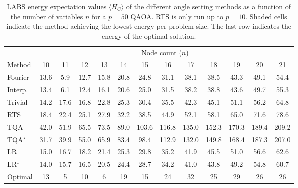 \documentclass[twocolumn,
english,
aps,
pra,
10pt,
longbibliography,
superscriptaddress,
amsmath,
amssymb,
floatfix
]{revtex4-2}
\begin{document}
{\begin{table}[t]
\centering
\caption{
LABS energy expectation values $\langle H_C \rangle$ of the different angle setting methods as a function of the number of variables $n$ for a $p=50$ QAOA. 
RTS is only run up to $p=10$.
Shaded cells indicate the method achieving the lowest energy per problem size.
The last row indicates the energy of the optimal solution.
}
\label{tab:labs_energy}
\footnotesize
\setlength{\tabcolsep}{3.3pt} 
\begin{tabular}{l *{12}{c}}
\hline\hline
& \multicolumn{12}{c}{Node count ($n$)} \\
Method & 10 & 11 & 12 & 13 & 14 & 15 & 16 & 17 & 18 & 19 & 20 & 21 \\ 
\midrule
Fourier     & 13.6 & \cellcolor[HTML]{C0C0C0}5.9 & 12.7 & \cellcolor[HTML]{C0C0C0}15.8 & 20.8 & \cellcolor[HTML]{C0C0C0}24.8 & \cellcolor[HTML]{C0C0C0}31.1 & \cellcolor[HTML]{C0C0C0}38.1 & \cellcolor[HTML]{C0C0C0}38.5 & \cellcolor[HTML]{C0C0C0}43.3 & \cellcolor[HTML]{C0C0C0}49.1 & \cellcolor[HTML]{C0C0C0}54.4 \\
Interp.      & \cellcolor[HTML]{C0C0C0}13.4 & 6.1 & \cellcolor[HTML]{C0C0C0}12.4 & 16.1 & \cellcolor[HTML]{C0C0C0}20.6 & 25.0 & 31.5 & 38.2 & 38.8 & 43.6 & 49.7 & 55.3 \\
Trivial     & 14.2 & 17.6 & 16.8 & 22.8 & 25.3 & 30.4 & 35.5 & 42.3 & 45.1    & 51.1 & 56.2 & 64.8 \\
RTS         & 18.4 & 22.4 & 25.1 & 27.9 & 32.2 & 38.5 & 44.9 & 52.1 & 58.1    & 65.0 & 71.6 & 78.6 \\
TQA         & 42.0 & 51.9 & 65.5 & 73.5 & 89.0 & 103.6 & 116.8 & 135.0 & 152.3 & 170.3 & 189.4 & 209.2 \\
TQA$^\star$ & 31.7 & 39.9 & 55.0 & 65.9 & 83.4 & 98.4 & 112.9 & 132.0 & 149.8 & 168.4 & 187.3 & 207.0 \\
LR          & 15.0 & 16.7 & 18.2 & 21.4 & 25.3 & 29.8 & 35.2 & 41.9 & 45.5 & 51.0 & 56.6 & 62.6 \\
LR$^\star$  & 14.0 & 15.7 & 16.5 & 20.5 & 24.4 & 28.7 & 34.2 & 41.0 & 43.8 & 49.2 & 54.8 & 60.7 \\ 
\hline
Optimal     & 13   & 5    & 10   & 6    & 19   & 15   & 24   & 32   & 25   & 29   & 26   & 26 \\ 
\hline \hline
\end{tabular}
\end{table}

}
\end{document}
